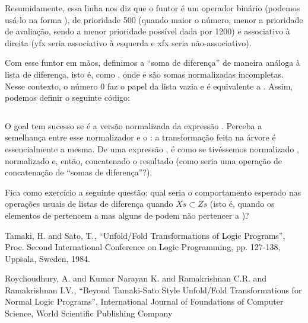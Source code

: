 \documentclass{article}
\begin{document}

\noindent Resumidamente, essa linha nos diz que o funtor  é um operador binário (podemos usá-lo na forma ), de prioridade
500 (quando maior o número, menor a prioridade de avaliação, sendo a menor prioridade possível dada por 1200) e associativo à direita (yfx seria associativo à esquerda e xfx seria não-associativo).

Com esse funtor em mãos, definimos a ``soma de diferença'' de maneira análoga à lista de diferença, isto é, como ,
onde  e  são somas normalizadas incompletas. Nesse contexto, o número 0 faz o papel da lista vazia e
 é equivalente a . Assim, podemos definir o seguinte código:

\inputminted{prolog}{../Exemplos/Cap3/progn_normalized_sum.pl}\label{lst:norm}

\noindent O goal  tem sucesso se  é a versão normalizada da expressão .
Perceba a semelhança entre esse normalizador e o : a transformação feita na árvore é essencialmente a mesma. De uma
expressão , é como se tivéssemos normalizado , normalizado  e, então, concatenado o
resultado (como seria uma operação de concatenação de ``somas de diferença''?).

Fica como exercício a seguinte questão: qual seria o comportamento esperado nas operações usuais de listas de diferença
 quando $Xs \subset Zs$
(isto é, quando os elementos de  pertencem a  mas alguns de  podem não pertencer a )?


  \begin{thebibliography}{1}


    Tamaki, H. and Sato, T.,
    ``Unfold/Fold Transformations of Logic Programs'',
    Proc. Second International Conference on Logic Programming,
    pp. 127-138,
    Uppsala, Sweden, 1984.


    Roychoudhury, A. and Kumar Narayan K. and Ramakrishnan C.R. and Ramakrishnan I.V.,
    ``Beyond Tamaki-Sato Style Unfold/Fold Transformations for Normal Logic Programs'',
    International Journal of Foundations of Computer Science,
    World Scientific Publishing Company


  \end{thebibliography}
\end{document}
